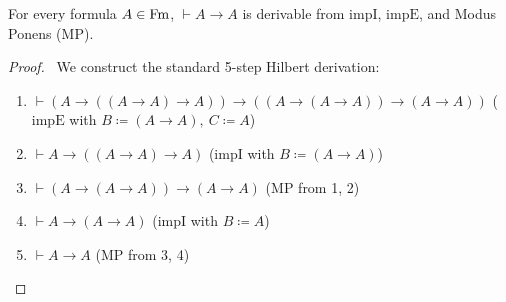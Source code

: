 \documentclass[10pt,a4paper]{article}
\renewcommand{\myprf}{\begin{proof}}
\renewcommand{\myqed}{\end{proof}}
\begin{document}
\begin{lemma}\label{lem:id_law}
For every formula $A \in {\textrm{Fm}}$, $\vdash A \to A$ is derivable from $\textrm{impI}$, $\textrm{impE}$, and Modus Ponens ($\textrm{MP}$).
\end{lemma}
\myprf\ We construct the standard 5-step Hilbert derivation:
\begin{enumerate}
\item $\vdash (A \to ((A \to A) \to A)) \to ((A \to (A \to A)) \to (A \to A))$ \hfill ($\textrm{impE}$ with $B \coloneqq (A \to A),\ C \coloneqq A$)
\item $\vdash A \to ((A \to A) \to A)$ \hfill ($\textrm{impI}$ with $B \coloneqq (A \to A)$)
\item $\vdash (A \to (A \to A)) \to (A \to A)$ \hfill ($\textrm{MP}$ from 1, 2)
\item $\vdash A \to (A \to A)$ \hfill ($\textrm{impI}$ with $B \coloneqq A$)
\item $\vdash A \to A$ \hfill ($\textrm{MP}$ from 3, 4)
\end{enumerate}
\myqed
\end{document}
